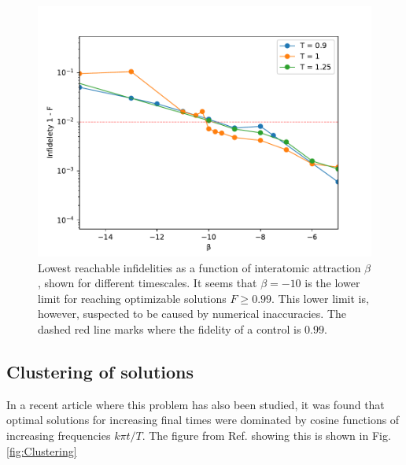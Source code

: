 \documentclass[a4paper, twocolumn]{revtex4-1}
\begin{document}
\begin{figure}
	\includegraphics[width=\columnwidth]{graphics/exploration/reachable_neg_beta.pdf}
	\caption{Lowest reachable infidelities as a function of interatomic attraction $\beta$, shown for different timescales. It seems that $\beta=-10$ is the lower limit for reaching optimizable solutions $F\geq0.99$. This lower limit is, however, suspected to be caused by numerical inaccuracies. The dashed red line marks where the fidelity of a control is $0.99$.}
	\label{fig:reachable_neg_betas}
\end{figure}

\subsection{\label{subsec:clustering}Clustering of solutions}
In a recent article \cite{QM2Paper} where this problem has also been studied, it was found that optimal solutions for increasing final times were dominated by cosine functions of increasing frequencies $k\pi t/T$. The figure from Ref.  \cite{QM2Paper} showing this is shown in Fig. \ref{fig:Clustering}
\end{document}
